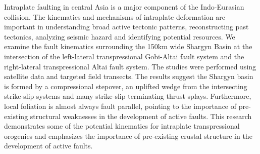 \begin{abstractpage}
Intraplate faulting in central Asia is a major component of the Indo-Eurasian collision. The kinematics and mechanisms of intraplate deformation are important in understanding broad active tectonic patterns, reconstructing past tectonics, analyzing seismic hazard and identifying potential resources. We examine the fault kinematics surrounding the 150km wide Shargyn Basin at the intersection of the left-lateral transpressional Gobi-Altai fault system and the right-lateral transpressional Altai fault system. The studies were performed using satellite data and targeted field transects. The results suggest the Shargyn basin is formed by a compressional stepover, an uplifted wedge from the intersecting strike-slip systems and many strike-slip terminating thrust splays. Furthermore, local foliation is almost always fault parallel, pointing to the importance of pre-existing structural weaknesses in the development of active faults. This research demonstrates some of the potential kinematics for intraplate transpressional orogenies and emphasizes the importance of pre-existing crustal structure in the development of active faults.
\end{abstractpage}
